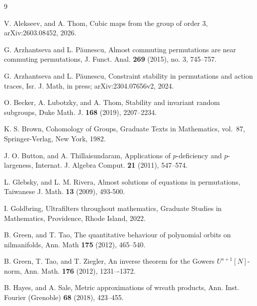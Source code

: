 \documentclass[a4paper,12pt]{amsart}
\theoremstyle{plain}
\theoremstyle{definition}
\theoremstyle{remark}
\numberwithin{equation}{subsection}
\begin{document}
\begin{thebibliography}{9}

    V. Alekseev, and A. Thom, 
    Cubic maps from the group of order 3, 
    arXiv:2603.08452, 2026.

    G. Arzhantseva and L. P\u{a}unescu,
    Almost commuting permutations are near commuting permutations,
    J. Funct. Anal. \textbf{269} (2015), no. 3, 745--757.

    G. Arzhantseva and L. P\u{a}unescu,
    Constraint stability in permutations and action traces, Isr. J. Math, in press;
    arXiv:2304.07656v2, 2024.

    O. Becker, A. Lubotzky, and A. Thom, 
    Stability and invariant random subgroups, 
    Duke Math. J. {\bf 168} (2019), 2207--2234.


    K. S. Brown,
    Cohomology of Groups,
    Graduate Texts in Mathematics, vol.~87,
    Springer-Verlag, New York, 1982.

    J. O. Button, and A. Thillaisundaram,
    Applications of $p$-deficiency and $p$-largeness,
    Internat. J. Algebra Comput. {\bf 21} (2011),  547--574.

    L. Glebsky, and L. M. Rivera, 
    Almost solutions of equations in permutations, 
    Taiwanese J. Math. {\bf 13} (2009), 493-500.

    I. Goldbring, 
    Ultrafilters throughout mathematics, 
    Graduate Studies in Mathematics, Providence, Rhode Island, 2022.

    B. Green, and T. Tao, 
    The quantitative behaviour of polynomial orbits on nilmanifolds, 
    Ann. Math {\bf 175} (2012), 465--540.

    B. Green, T. Tao, and T. Ziegler, 
    An inverse theorem for the Gowers $U^{s+1}[N]$-norm,
    Ann. Math. {\bf 176} (2012), 1231–-1372.

    B. Hayes, and A. Sale,
    Metric approximations of wreath products,
    Ann. Inst. Fourier (Grenoble) {\bf 68} (2018), 423--455.



\end{thebibliography}
\end{document}
